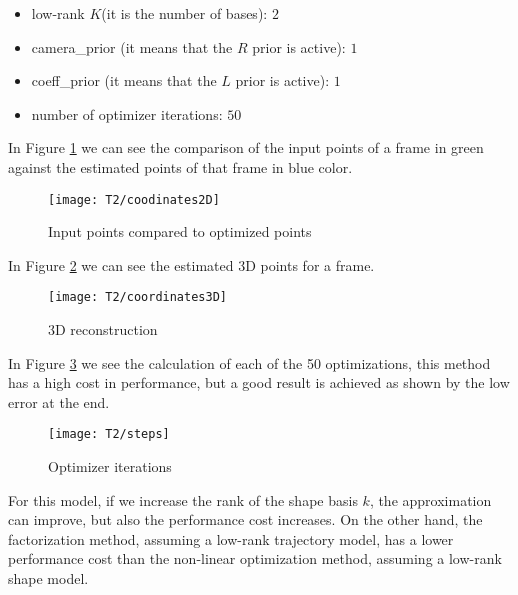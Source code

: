 \begin{itemize}
\item low-rank $K$(it is the number of bases): $2$
\item camera\_prior (it means that the $R$ prior is active): $1$
\item coeff\_prior (it means that the $L$ prior is active): $1$
\item number of optimizer iterations: $50$
\end{itemize}
\noindent In Figure \ref{fig:coodinates2D} we can see the comparison of the input points of a frame in green against the estimated points of that frame in blue color.\\

\begin{figure}[h!]
    \centering
    \texttt{[image: T2/coodinates2D]}
    \caption{Input points compared to optimized points}
    \label{fig:coodinates2D}
\end{figure}

\noindent In Figure \ref{fig:coordinates3D} we can see the estimated 3D points for a frame.\\ 
\begin{figure}[h!]
    \centering
    \texttt{[image: T2/coordinates3D]}
    \caption{3D reconstruction}
    \label{fig:coordinates3D}
\end{figure}

\noindent In Figure \ref{fig:steps} we see the calculation of each of the 50 optimizations, this method has a high cost in performance, but a good result is achieved as shown by the low error at the end.\\
\begin{figure}[h!]
    \centering
    \texttt{[image: T2/steps]}
    \caption{Optimizer iterations}
    \label{fig:steps}
\end{figure}

\noindent For this model, if we increase the rank of the shape basis $k$, the approximation can improve, but also the performance cost increases. On the other hand, the factorization method, assuming a low-rank trajectory model, has a lower performance cost than the non-linear optimization method, assuming a low-rank shape model. 

